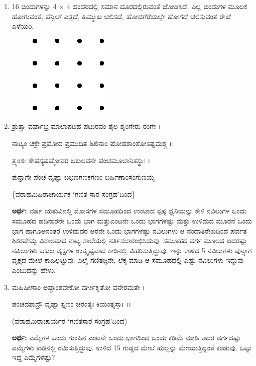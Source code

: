 \begin{enumerate}
\item 16 ಬಿಂದುಗಳನ್ನು 4 $\times$ 4 ಹಂದರದಲ್ಲಿ ಸಮಾನ ದೂರದಲ್ಲಿರುವಂತೆ ಜೋಡಿಸಿದೆ. ಎಲ್ಲ ಬಿಂದುಗಳ ಮೂಲಕ ಹೋಗುವಂತೆ, ಪೆನ್ಸಿಲ್ ಎತ್ತದೆ, ಹಿಮ್ಮುಖ ಚಲಿಸದೆ, ಹೋದಗೆರೆಯಲ್ಲೇ ಹೋಗದೆ ಚಲಿಸುವಂತೆ ರೇಖೆ ಎಳೆಯಿರಿ. 
\begin{figure}[H]
\centering
\includegraphics[scale=1.2]{images/chap11/q17.eps}
\end{figure}


\item ಶ್ರುತ್ವಾ ವರ್ಷಾಭ್ರ ಮಾಲಾಪಟಹ ಪಟುರವಂ ಶೈಲ ಶೃಂಗೇರು ರಂಗೇ ।

ನಾಟ್ಯಂ ಚಕ್ರೇ ಪ್ರಮೋದ ಪ್ರಮುದಿತ ಶಿಖಿನಾಂ ಷೋಡಶಾಂಶೋಽಷ್ಟಮಶ್ಚ ।।

ತ್ರ್ಯಂಶಃ ಶೇಷಸ್ಯಷಷ್ಠೋವರ ಬಕುಲವನೇ ಪಂಚಮೂಲಾನಿತಸ್ಥುಃ ।

ಪುನ್ನಾಗೇ ಪಂಚ ದೃಷ್ಟಾ ಬಭಣಗಣಕಗಣಂ ಬರ್ಹಿಣಾಂಸಂಗುಣಯ್ಯ 

\smallskip

\hfill \{ವರಾಹಮಿಹಿರಾಚಾರ್ಯಕ `ಗಣಿತ ಸಾರ ಸಂಗ್ರಹ'ದಿಂದ\}

\smallskip

{\bf ಅರ್ಥ:} ವರ್ಷ ಋತುವಿನಲ್ಲಿ ಮೋಸಗಳ ಸಮೂಹದಿಂದ ಉಂಟಾದ ಸ್ಪಷ್ಠ ಧ್ವನಿಯನ್ನು ಕೇಳಿ ನವಿಲುಗಳ ಒಂದು ಸಮೂಹದ ಹದಿನಾರನೇ ಒಂದು ಭಾಗ ಮತ್ತು\break ಎಂಟನೇ ಒಂದು ಭಾಗಗಳಷ್ಟು ಮತ್ತು ಉಳಿದುದ ಮೂರನೆ ಒಂದು ಭಾಗ ಹಾಗೂ\break ಅನಂತರ ಉಳಿದುದರ ಆರನೇ ಒಂದು ಭಾಗಗಳಷ್ಟು ನವಿಲುಗಳು ಆ ನಂದಾತಿ\break ರೇಖದಿಂದ ಪರ್ವತ ಶಿಕರವೇಮ್ಬ ವಿಶಾಲವಾದ ನಾಟ್ಯ ಶಾಲೆಯಲ್ಲಿ ನರ್ತಿಸಲಾ\-ರಂಭಿಸಿದುವು. ಸಮೂಹದ ವರ್ಗ ಮೂಲದ ಐದರಷ್ಟು ನವಿಲುಗಳು ಬಕುಲ ವೃಕ್ಷಗಳ ಉತ್ಕೃಷ್ಟವಾದ ಕಾಡಿನಲ್ಲಿ ವಿಹರಿಸುತ್ತಿದ್ದುವು. ಇನ್ನು ಉಳಿದ 5 ನವಿಲುಗಳು ಪುನ್ನಾಗ ವೃಕ್ಷದ ಮೇಲೆ ಕಾಹಿಲ್ಪಟ್ಟುವು. ಎಲೈ ಗಣಿತಜ್ಞನೇ, ಲೆಕ್ಕ ಮಾಡಿ ಆ ಸಮೂಹದಲ್ಲಿ ಎಷ್ಟು ನವಿಲುಗಳು ಇದ್ದುವು ಎಂಬುದನ್ನು ಹೇಳು.  

\item ಮಹಿಷೀಣಾಂ ಅಷ್ಟಾಂಶವೇಕೋ ವರ್ಗೀಕೃತೋ ವನೇರಮತೇ ।

ಪಂಚದಶಾದ್ರೌ ದೃಷ್ಟಾ ಸ್ತೃಣಂ ಚರಂತ್ಯಃ ಕಿಯಂತ್ಯಸ್ತಾಃ ।।

\smallskip

\hfill (ವರಾಹಮಿರಾಚಾರ್ಯರ `ಗಣಿತಸಾರ ಸಂಗ್ರಹ'ದಿಂದ)

\smallskip

{\bf ಅರ್ಥ:} ಎಮ್ಮೆಗಳ ಒಂದು ಗುಂಪಿನ ಎಂಟನೇ ಒಂದು ಭಾಗದಿಂದ ಒಂದು ಕಡಿಮೆ ಮಾಡಿ ಅದರ ವರ್ಗದಷ್ಟು ಎಮ್ಮೆಗಳು ಕಾಡಿನಲ್ಲಿ ರಮಿಸುತ್ತಿದ್ದುವು. ಉಳಿದ 15 ಗುಡ್ಡದ ಮೇಲೆ ಹುಲ್ಲನ್ನು ಮೇಯುತ್ತಿದ್ದಂತೆ ಕಂಡುವು. ಒಟ್ಟು ಇದ್ದ ಎಮ್ಮೆಗಳೆಷ್ಟು? 


\end{enumerate}
